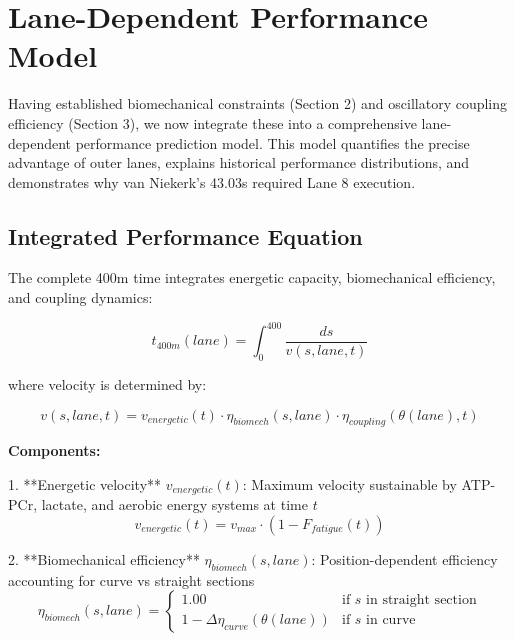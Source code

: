 \section{Lane-Dependent Performance Model}

Having established biomechanical constraints (Section 2) and oscillatory coupling efficiency (Section 3), we now integrate these into a comprehensive lane-dependent performance prediction model. This model quantifies the precise advantage of outer lanes, explains historical performance distributions, and demonstrates why van Niekerk's 43.03s required Lane 8 execution.

\subsection{Integrated Performance Equation}

The complete 400m time integrates energetic capacity, biomechanical efficiency, and coupling dynamics:

\begin{equation}
t_{400m}(lane) = \int_0^{400} \frac{ds}{v(s, lane, t)}
\end{equation}

where velocity is determined by:

\begin{equation}
v(s, lane, t) = v_{energetic}(t) \cdot \eta_{biomech}(s, lane) \cdot \eta_{coupling}(\theta(lane), t)
\end{equation}

\textbf{Components:}

1. **Energetic velocity** $v_{energetic}(t)$: Maximum velocity sustainable by ATP-PCr, lactate, and aerobic energy systems at time $t$
\begin{equation}
v_{energetic}(t) = v_{max} \cdot \left(1 - F_{fatigue}(t)\right)
\end{equation}

2. **Biomechanical efficiency** $\eta_{biomech}(s, lane)$: Position-dependent efficiency accounting for curve vs straight sections
\begin{equation}
\eta_{biomech}(s, lane) = \begin{cases}
1.00 & \text{if } s \text{ in straight section} \\
1 - \Delta\eta_{curve}(\theta(lane)) & \text{if } s \text{ in curve}
\end{cases}
\end{equation}

